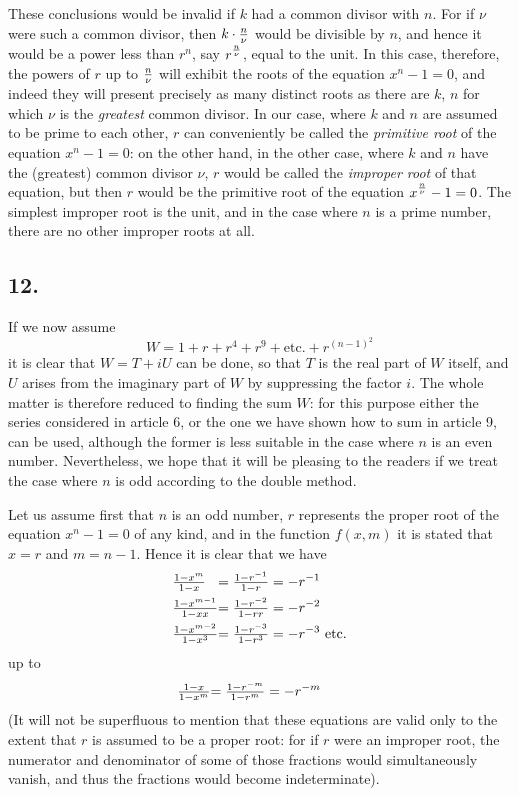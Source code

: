 \documentclass[twoside,12pt, showframe]{memoir}
\let\oldfrac\frac
\def\frac#1#2{\mathchoice{\tfrac{#1}{#2}}{\oldfrac{#1}{#2}}{\genfrac{}{}{}{2}{#1}{#2\mathstrut}}{\genfrac{}{}{}{3}{#1}{#2\mathstrut}}}
\begin{document}
These conclusions would be invalid if \(k\) had a common divisor with \(n\). For if \(\nu\) were such a common divisor, then \(k \cdot \frac{n}{\nu}\) would be divisible by \(n\), and hence it would be a power less than \(r^{n}\), say \(r^{\frac{n}{\nu}}\), equal to the unit. In this case, therefore, the powers of \(r\) up to \(\frac{n}{\nu}\) will exhibit the roots of the equation \(x^{n}-1=0\), and indeed they will present precisely as many distinct roots as there are \(k\), \(n\) for which \(\nu\) is the \textit{greatest} common divisor. In our case, where \(k\) and \(n\) are assumed to be prime to each other, \(r\) can conveniently be called the \textit{primitive root} of the equation \(x^{n}-1=0\): on the other hand, in the other case, where \(k\) and \(n\) have the (greatest) common divisor \(\nu\), \(r\) would be called the \textit{improper root} of that equation, but then \(r\) would be the primitive root of the equation \(x^{\frac{n}{\nu}}-1=0\). The simplest improper root is the unit, and in the case where \(n\) is a prime number, there are no other improper roots at all.
%

\subsection*{12.}

If we now assume 
\[W=1+r+r^{4}+r^{9}+\text{etc.}+r^{(n-1)^{2}}\]
it is clear that \(W=T+i U\) can be done, so that \(T\) is the real part of \(W\) itself, and \(U\) arises from the imaginary part of \(W\) by suppressing the factor \(i\). The whole matter is therefore reduced to finding the sum \(W\): for this purpose either the series considered in article 6, or the one we have shown how to sum in article 9, can be used, although the former is less suitable in the case where \(n\) is an even number. Nevertheless, we hope that it will be pleasing to the readers if we treat the case where \(n\) is odd according to the double method.
%

Let us assume first that \(n\) is an odd number, \(r\) represents the proper root of the equation \(x^{n}-1=0\) of any kind, and in the function \(f(x, m)\) it is stated that \(x=r\) and \(m=n-1\). Hence it is clear that we have
\[\begin{alignedat}[t]{3}
& \frac{1-x^{m}}{1-x}&=\frac{1-r^{-1}}{1-r}&=-r^{-1} \\
& \frac{1-x^{m-1}}{1-x x}&=\frac{1-r^{-2}}{1-r r}&=-r^{-2} \\
& \frac{1-x^{m-2}}{1-x^{3}}&=\frac{1-r^{-3}}{1-r^{3}}&=-r^{-3} \text{ etc.}
\end{alignedat}\]
up to
\[\begin{alignedat}[t]{3}
&\frac{1-x}{1-x^{m}}&=\frac{1-r^{-m}}{1-r^{m}}&=-r^{-m}\phantom{\text{etc.}}
\end{alignedat}\]
(It will not be superfluous to mention that these equations are valid only to the extent that \(r\) is assumed to be a proper root: for if \(r\) were an improper root, the numerator and denominator of some of those fractions would simultaneously vanish, and thus the fractions would become indeterminate).
%
\end{document}
